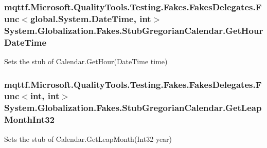 \hypertarget{class_system_1_1_globalization_1_1_fakes_1_1_stub_gregorian_calendar_a06a93a1401208e6f93434b21f6d2219c}{
\subsubsection[{Get\-Hour\-Date\-Time}]{\setlength{\rightskip}{0pt plus 5cm}mqttf.\-Microsoft.\-Quality\-Tools.\-Testing.\-Fakes.\-Fakes\-Delegates.\-Func$<$global.\-System.\-Date\-Time, int$>$ System.\-Globalization.\-Fakes.\-Stub\-Gregorian\-Calendar.\-Get\-Hour\-Date\-Time}}\label{class_system_1_1_globalization_1_1_fakes_1_1_stub_gregorian_calendar_a06a93a1401208e6f93434b21f6d2219c}


Sets the stub of Calendar.\-Get\-Hour(\-Date\-Time time)

\hypertarget{class_system_1_1_globalization_1_1_fakes_1_1_stub_gregorian_calendar_a67e31742a1d7b3e23b3ee6a3726f307c}{
\subsubsection[{Get\-Leap\-Month\-Int32}]{\setlength{\rightskip}{0pt plus 5cm}mqttf.\-Microsoft.\-Quality\-Tools.\-Testing.\-Fakes.\-Fakes\-Delegates.\-Func$<$int, int$>$ System.\-Globalization.\-Fakes.\-Stub\-Gregorian\-Calendar.\-Get\-Leap\-Month\-Int32}}\label{class_system_1_1_globalization_1_1_fakes_1_1_stub_gregorian_calendar_a67e31742a1d7b3e23b3ee6a3726f307c}


Sets the stub of Calendar.\-Get\-Leap\-Month(\-Int32 year)

